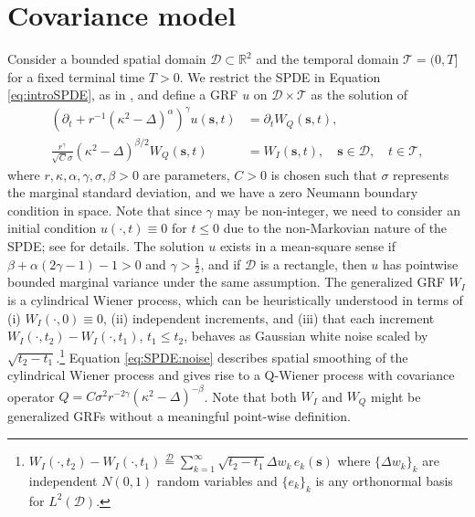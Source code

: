 \documentclass[12pt]{article} %
\begin{document}
\section{Covariance model}\label{sec:CovModel}
Consider a bounded spatial domain $\mathcal{D}\subset\mathbb{R}^2$ and the temporal domain $\mathcal{T} = (0, T]$ for a fixed terminal time $T>0$. We restrict the SPDE in Equation \eqref{eq:introSPDE}, as in \citet{kirchner2022}, and define a GRF $u$ on $\mathcal{D}\times \mathcal{T}$ as the solution of
\begin{align}
    \left(\partial_t + r^{-1} (\kappa^2 - \Delta)^\alpha \right)^\gamma u(\boldsymbol{s},t) &= \partial_t W_Q(\boldsymbol{s},t),\label{eq:SPDE:frac}\\
     \frac{r^\gamma}{\sqrt{C} \sigma}(\kappa^2 - \Delta)^{\beta/2}W_Q(\boldsymbol{s},t) &= W_I(\boldsymbol{s},t),  \quad \boldsymbol{s}\in \mathcal{D}, \quad t\in \mathcal{T},\label{eq:SPDE:noise}
\end{align}
where $r, \kappa, \alpha, \gamma, \sigma, \beta > 0$ are parameters, $C>0$ is chosen such that $\sigma$ represents the marginal standard deviation, and we have a zero Neumann boundary condition 
in space. Note that since $\gamma$ may be non-integer, we need to consider an initial condition $u(\cdot, t) \equiv 0$ for $t\leq 0$ due to the non-Markovian nature of the SPDE; see \citet{kirchner2022} for details. The solution $u$ exists in a mean-square sense if $\beta + \alpha (2 \gamma - 1) - 1 > 0$ and $\gamma>\tfrac12$, and if $\mathcal{D}$ is a rectangle, then $u$ has pointwise bounded marginal variance under the same assumption. The generalized GRF $W_I$ is a cylindrical Wiener process, which can be heuristically understood in terms of (i) $W_I(\cdot, 0) \equiv 0$, (ii) independent increments, and (iii) that each increment $W_I(\cdot,t_2)-W_I(\cdot, t_1)$, $t_1\leq t_2$, behaves as Gaussian white noise scaled by $\sqrt{t_2-t_1}$.\footnote{$W_I(\cdot,t_2)-W_I(\cdot, t_1)\overset{\mathcal D}{=}\sum_{k = 1}^\infty \sqrt{t_2-t_1}\Delta w_{k}\, e_k(\boldsymbol{s})$ where $\{\Delta w_{k}\}_k$ are independent $N(0,1)$ random variables and $\{e_k\}_k$ is any orthonormal basis for $L^2(\mathcal D)$.}
Equation \eqref{eq:SPDE:noise} describes spatial smoothing of the cylindrical Wiener process and gives rise to a Q-Wiener process with covariance operator $Q = C\sigma^2 r^{-2\gamma}(\kappa^2-\Delta)^{-\beta}$. Note that both $W_I$ and $W_Q$ might be generalized GRFs without a meaningful point-wise definition.
\end{document}

